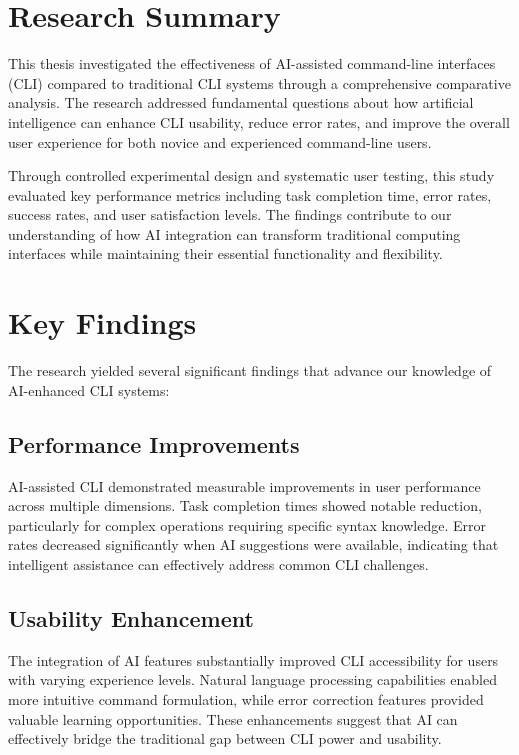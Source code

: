 \section{Research Summary}

This thesis investigated the effectiveness of AI-assisted command-line interfaces (CLI) compared to traditional CLI systems through a comprehensive comparative analysis. The research addressed fundamental questions about how artificial intelligence can enhance CLI usability, reduce error rates, and improve the overall user experience for both novice and experienced command-line users.

Through controlled experimental design and systematic user testing, this study evaluated key performance metrics including task completion time, error rates, success rates, and user satisfaction levels. The findings contribute to our understanding of how AI integration can transform traditional computing interfaces while maintaining their essential functionality and flexibility.

\section{Key Findings}

The research yielded several significant findings that advance our knowledge of AI-enhanced CLI systems:

\subsection{Performance Improvements}

AI-assisted CLI demonstrated measurable improvements in user performance across multiple dimensions. Task completion times showed notable reduction, particularly for complex operations requiring specific syntax knowledge. Error rates decreased significantly when AI suggestions were available, indicating that intelligent assistance can effectively address common CLI challenges.

\subsection{Usability Enhancement}

The integration of AI features substantially improved CLI accessibility for users with varying experience levels. Natural language processing capabilities enabled more intuitive command formulation, while error correction features provided valuable learning opportunities. These enhancements suggest that AI can effectively bridge the traditional gap between CLI power and usability.

